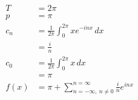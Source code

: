 \documentclass{article}
\begin{document}
\setcounter{subsubsection}{4}
\subsubsection{}

\begin{align*}
  T    & = 2 \pi                                                                 \\
  p    & = \pi                                                                   \\
  c_n  & = \frac{1}{2 \pi} \int_0^{2 \pi} x e^{-i n x} \,d x                     \\
       & = \frac{i}{n}                                                           \\
  c_0  & = \frac{1}{2 \pi} \int_0^{2 \pi} x \,d x                                \\
       & = \pi                                                                   \\
  f(x) & = \pi + \sum_{n = -\infty,\ n \ne 0}^{n = \infty} \frac{i}{n} e^{i n x}
\end{align*}
\end{document}
